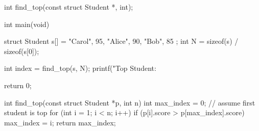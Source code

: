 \documentclass[12pt, a4paper, answers, addpoints]{exam}
\begin{document}
\begin{questions}
\begin{CcodeSol}
int find_top(const struct Student *, int);

int main(void) {
    struct Student s[] = {
        {"Carol", 95},
        {"Alice", 90},
        {"Bob", 85}
    };
    int N = sizeof(s) / sizeof(s[0]);

    int index = find_top(s, N);
    printf("Top Student: %

    return 0;
}
int find_top(const struct Student *p, int n) {
    int max_index = 0;              // assume first student is top
    for (int i = 1; i < n; i++) {
        if (p[i].score > p[max_index].score) {
            max_index = i;
        }
    }
    return max_index;
}

\end{CcodeSol}


\end{questions}


\vfill
\noindent{}
\end{document}
